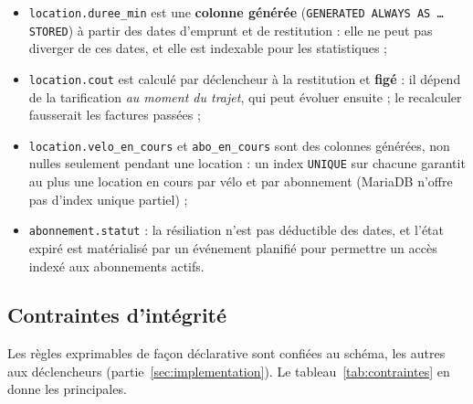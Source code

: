 \begin{itemize}
	\item \texttt{location.duree\_min} est une \textbf{colonne générée} (\texttt{GENERATED ALWAYS AS \ldots{} STORED}) à partir des dates d'emprunt et de restitution : elle ne peut pas diverger de ces dates, et elle est indexable pour les statistiques ;
	\item \texttt{location.cout} est calculé par déclencheur à la restitution et \textbf{figé} : il dépend de la tarification \emph{au moment du trajet}, qui peut évoluer ensuite ; le recalculer fausserait les factures passées ;
	\item \texttt{location.velo\_en\_cours} et \texttt{abo\_en\_cours} sont des colonnes générées, non nulles seulement pendant une location : un index \texttt{UNIQUE} sur chacune garantit \og au plus une location en cours \fg{} par vélo et par abonnement (MariaDB n'offre pas d'index unique partiel) ;
	\item \texttt{abonnement.statut} : la résiliation n'est pas déductible des dates, et l'état \og expiré \fg{} est matérialisé par un événement planifié pour permettre un accès indexé aux abonnements actifs.
\end{itemize}

\subsection{Contraintes d'intégrité}

Les règles exprimables de façon déclarative sont confiées au schéma, les autres aux déclencheurs (partie~\ref{sec:implementation}). Le tableau~\ref{tab:contraintes} en donne les principales.

